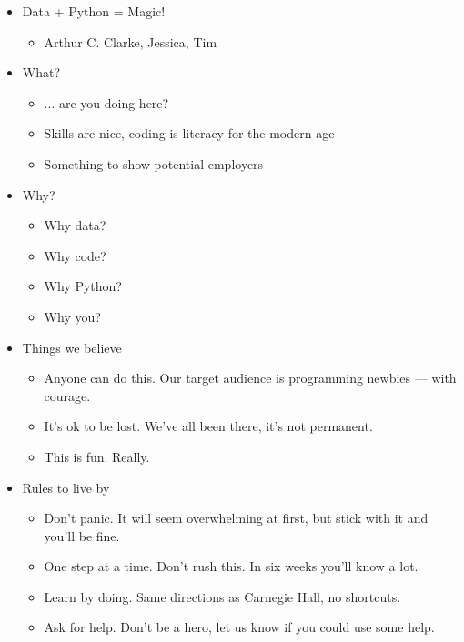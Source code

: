 \documentclass[11pt]{article}
\begin{document}
\begin{itemize}
\item Data + Python = Magic!  
\begin{itemize}
\item Arthur C. Clarke, Jessica, Tim 
\end{itemize}

\item What?
\begin{itemize}
\item ... are you doing here?
\item Skills are nice, coding is literacy for the modern age  
\item Something to show potential employers
\end{itemize}

\item Why?
\begin{itemize}
\item Why data?
\item Why code?
\item Why Python?
\item Why you?
\end{itemize}

\item Things we believe 
\begin{itemize}
\item Anyone can do this.  Our target audience is programming newbies --- with courage. 
\item It's ok to be lost.  We've all been there, it's not permanent.  
\item This is fun.  Really.  
\end{itemize}


\item Rules to live by
\begin{itemize}
\item Don't panic.  It will seem overwhelming at first, but stick with it and you'll be fine.
\item One step at a time.  Don't rush this.  In six weeks you'll know a lot.  
\item Learn by doing.  Same directions as Carnegie Hall, no shortcuts.  
\item Ask for help.  Don't be a hero, let us know if you could use some help.  
\end{itemize}


\end{itemize}
\end{document}
